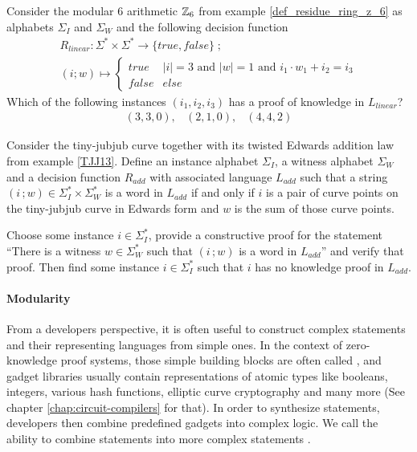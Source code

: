\begin{exercise} Consider the modular $6$ arithmetic $\mathbb{Z}_6$ from example \ref{def_residue_ring_z_6} as alphabets $\Sigma_I$ and $\Sigma_W$ and the following decision function
\begin{multline*}
R_{linear} : \Sigma^* \times \Sigma^* \to \{true, false\}\;;\;\\
(i;w) \mapsto
\begin{cases}
true & |i|=3 \text{ and } |w|=1 \text{ and } i_1\cdot w_1 + i_2 = i_3\\
false & else
\end{cases}
\end{multline*}
Which of the following instances $(i_1,i_2,i_3)$ has a proof of knowledge in $L_{linear}$?
$$ 
\begin{array}{ccc}
(3,3,0) , & (2,1,0), & (4,4,2)
\end{array}
$$
\end{exercise}
\begin{exercise}
\label{ex:TJJ-addition-lang} Consider the tiny-jubjub curve together with its twisted Edwards addition law from example \ref{TJJ13}. Define an instance alphabet $\Sigma_I$, a witness alphabet $\Sigma_W$ and a decision function $R_{add}$ with associated language $L_{add}$ such that a string $(i\,;w)\in \Sigma_I^* \times \Sigma_W^*$ is a word in $L_{add}$ if and only if $i$ is a pair of curve points on the tiny-jubjub curve in Edwards form and $w$ is the sum of those curve points.

Choose some instance $i\in \Sigma_I^*$, provide a constructive proof for the statement ``There is a witness $w\in \Sigma_W^*$ such that $(i\,;w)$ is a word in $L_{add}$'' and verify that proof. Then find some instance $i\in \Sigma_I^*$ such that $i$ has no knowledge proof in $L_{add}$.
\end{exercise}
\paragraph{Modularity}\label{modularity} From a developers perspective, it is often useful to construct complex statements and their representing languages from simple ones. In the context of zero-knowledge proof systems, those simple building blocks are often called , and gadget libraries usually contain representations of atomic types like booleans, integers, various hash functions, elliptic curve cryptography and many more (See chapter \ref{chap:circuit-compilers} for that). In order to synthesize statements, developers then combine predefined gadgets into complex logic. We call the ability to combine statements into more complex statements . 

